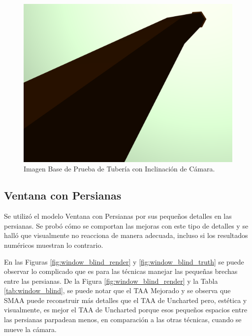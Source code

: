 \documentclass[pregrado]{tesis-usb} %
\begin{document}
\begin{figure}[!htb]
	\centering
	\includegraphics[scale=0.2]{images/results/pipe_with_inclination_sobel_ground_truth.png}
	\caption{Imagen Base de Prueba de Tubería con Inclinación de Cámara.}\label{fig:pipe_inclination_truth}
\end{figure}

\FloatBarrier

\subsection{Ventana con Persianas}
Se utilizó el modelo Ventana con Persianas por sus pequeños detalles en las persianas. Se probó cómo se comportan las mejoras con este tipo de detalles y se halló que visualmente no reacciona de manera adecuada, incluso si los resultados numéricos muestran lo contrario. 

En las Figuras \ref{fig:window_blind_render} y \ref{fig:window_blind_truth} se puede observar lo complicado que es para las técnicas manejar las pequeñas brechas entre las persianas. De la Figura \ref{fig:window_blind_render} y la Tabla \ref{tab:window_blind}, se puede notar que el TAA Mejorado y se observa que SMAA puede reconstruir más detalles que el TAA de Uncharted pero, estética y visualmente, es mejor el TAA de Uncharted porque esos pequeños espacios entre las persianas parpadean menos, en comparación a las otras técnicas, cuando se mueve la cámara.
\end{document}
